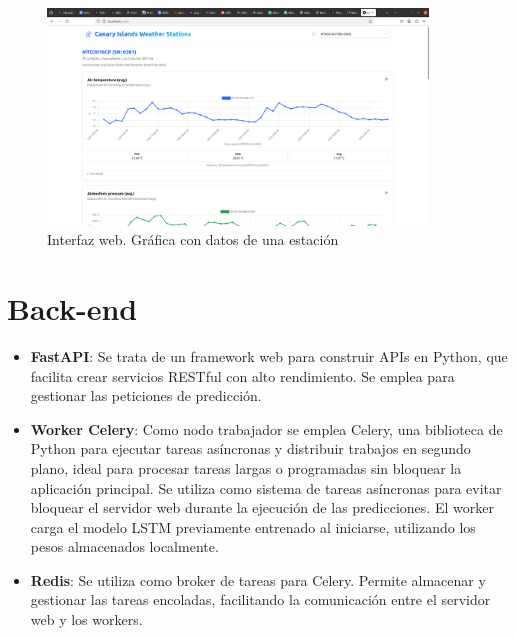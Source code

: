 \begin{figure}[H]
    \centering
    \includegraphics[width=0.9\textwidth]{images/frontend_loaded.png}
    \caption{Interfaz web. Gráfica con datos de una estación}
    \label{front_end_loaded}
\end{figure}


\section{Back-end}

\begin{itemize}
    \item \textbf{FastAPI}: Se trata de un framework web para construir APIs en Python, que facilita crear servicios RESTful con alto rendimiento. Se emplea para gestionar las peticiones de predicción.
    \item \textbf{Worker Celery}: Como nodo trabajador se emplea Celery, una biblioteca de Python para ejecutar tareas asíncronas y distribuir trabajos en segundo plano, ideal para procesar tareas largas o programadas sin bloquear la aplicación principal. 
    Se utiliza como sistema de tareas asíncronas para evitar bloquear el servidor web durante la ejecución de las predicciones. El worker carga el modelo LSTM previamente entrenado al iniciarse, utilizando los pesos almacenados localmente. 
    \item \textbf{Redis}: Se utiliza como broker de tareas para Celery. Permite almacenar y gestionar las tareas encoladas, facilitando la comunicación entre el servidor web y los workers.
\end{itemize}

